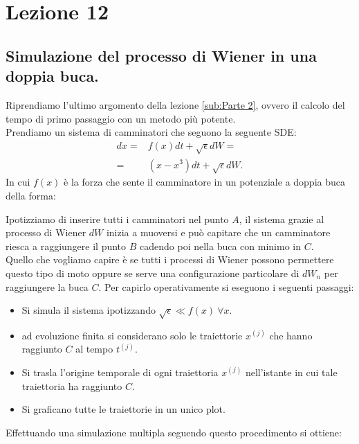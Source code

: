 \section{Lezione 12}%
\label{sub:Lezione 12}
\subsection{Simulazione del processo di Wiener in una doppia buca.}%
\label{sub:Simulazione dei camminatori.}
Riprendiamo l'ultimo argomento della lezione \ref{sub:Parte 2}, ovvero il calcolo del tempo di primo passaggio con un metodo più potente. \\
Prendiamo un sistema di camminatori che seguono la seguente SDE:
\begin{equation}
\begin{aligned}
    dx = & f(x) dt + \sqrt{\epsilon} dW = \\
    = & \left(x-x^3\right)dt + \sqrt{\epsilon} dW
.\end{aligned}
\label{eq:12_beg}
\end{equation}
In cui $f(x)$ è la forza che sente il camminatore in un potenziale a doppia buca della forma:

\noindent
Ipotizziamo di inserire tutti i camminatori nel punto $A$, il sistema grazie al processo di Wiener $dW$ inizia a muoversi e può capitare che un camminatore riesca a raggiungere il punto $B$ cadendo poi nella buca con minimo in $C$. \\
Quello che vogliamo capire è se tutti i processi di Wiener possono permettere questo tipo di moto oppure se serve una configurazione particolare di $dW_n$ per raggiungere la buca $C$. Per capirlo operativamente si eseguono i seguenti passaggi:
\begin{itemize}
    \item Si simula il sistema ipotizzando $\sqrt{\epsilon} \ll f(x) \ \forall x$.
    \item ad evoluzione finita si considerano solo le traiettorie $x^{(j)}$ che hanno raggiunto $C$ al tempo $t^{(j)}$.
    \item Si trasla l'origine temporale di ogni traiettoria $x^{(j)}$ nell'istante in cui tale traiettoria ha raggiunto $C$.
    \item Si graficano tutte le traiettorie in un unico plot.
\end{itemize}
Effettuando una simulazione multipla seguendo questo procedimento si ottiene:
